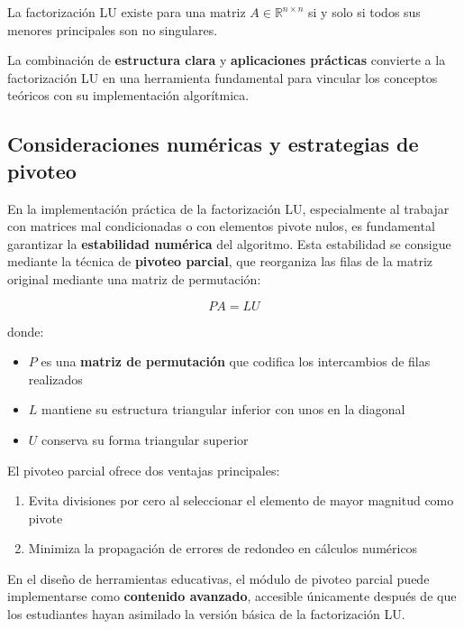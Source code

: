 	La factorización LU existe para una matriz $A \in \mathbb{R}^{n \times n}$ si y solo si todos sus menores principales son no singulares.

La combinación de \textbf{estructura clara} y \textbf{aplicaciones prácticas} convierte a la factorización LU en una herramienta fundamental para vincular los conceptos teóricos con su implementación algorítmica.


\subsection{Consideraciones numéricas y estrategias de pivoteo}

En la implementación práctica de la factorización LU, especialmente al trabajar con matrices mal condicionadas o con elementos pivote nulos, es fundamental garantizar la \textbf{estabilidad numérica} del algoritmo. Esta estabilidad se consigue mediante la técnica de \textbf{pivoteo parcial}, que reorganiza las filas de la matriz original mediante una matriz de permutación:

\[
PA = LU
\]

donde:
\begin{itemize}
	\item $P$ es una \textbf{matriz de permutación} que codifica los intercambios de filas realizados
	\item $L$ mantiene su estructura triangular inferior con unos en la diagonal
	\item $U$ conserva su forma triangular superior
\end{itemize}

El pivoteo parcial ofrece dos ventajas principales:
\begin{enumerate}
	\item Evita divisiones por cero al seleccionar el elemento de mayor magnitud como pivote
	\item Minimiza la propagación de errores de redondeo en cálculos numéricos
\end{enumerate}

	En el diseño de herramientas educativas, el módulo de pivoteo parcial puede implementarse como \textbf{contenido avanzado}, accesible únicamente después de que los estudiantes hayan asimilado la versión básica de la factorización LU.

